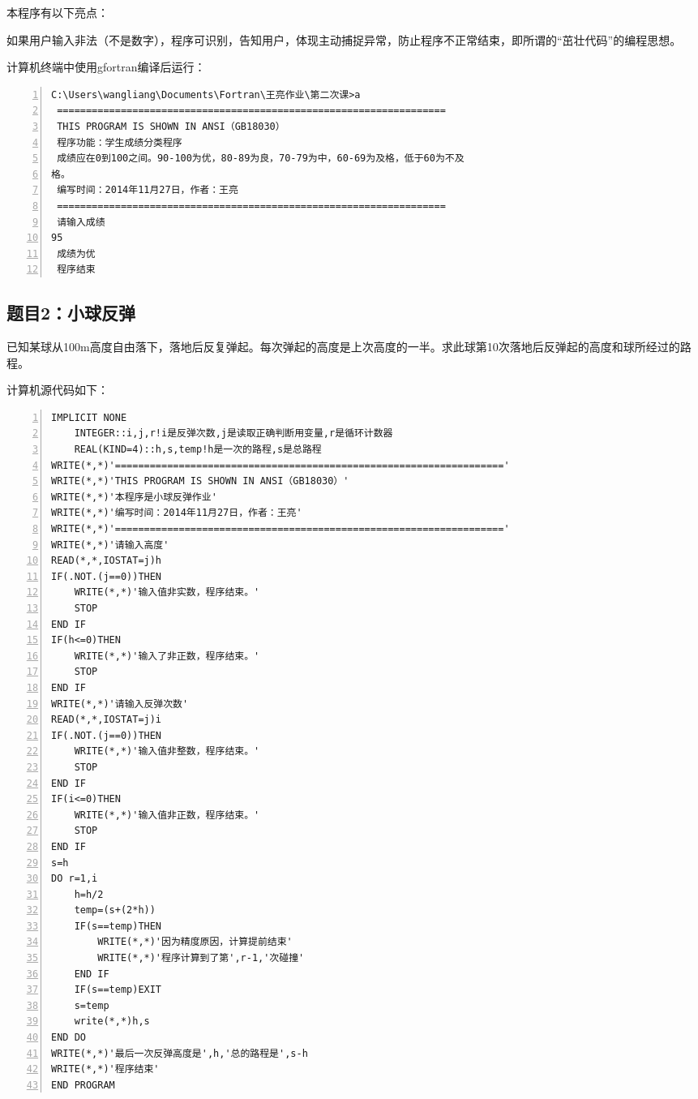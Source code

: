 \documentclass[hyperref,UTF-8]{ctexart}
\begin{document}
本程序有以下亮点：
\begin{dinglist}{47}
\item 如果用户输入非法（不是数字），程序可识别，告知用户，体现主动捕捉异常，防止程序不正常结束，即所谓的“茁壮代码”的编程思想。
\end{dinglist}

计算机终端中使用gfortran编译后运行：

\begin{Verbatim}[numbers=left,fontsize=\small]
C:\Users\wangliang\Documents\Fortran\王亮作业\第二次课>a
 ===================================================================
 THIS PROGRAM IS SHOWN IN ANSI（GB18030）
 程序功能：学生成绩分类程序
 成绩应在0到100之间。90-100为优，80-89为良，70-79为中，60-69为及格，低于60为不及
格。
 编写时间：2014年11月27日，作者：王亮
 ===================================================================
 请输入成绩
95
 成绩为优
 程序结束
\end{Verbatim}
\subsection{题目2：小球反弹}
已知某球从100m高度自由落下，落地后反复弹起。每次弹起的高度是上次高度的一半。求此球第10次落地后反弹起的高度和球所经过的路程。

计算机源代码如下：

\begin{Verbatim}[numbers=left,commandchars=\\\{\},fontsize=\small]
IMPLICIT NONE
	INTEGER::i,j,r!i是反弹次数,j是读取正确判断用变量,r是循环计数器
	REAL(KIND=4)::h,s,temp!h是一次的路程,s是总路程
WRITE(*,*)'==================================================================='
WRITE(*,*)'THIS PROGRAM IS SHOWN IN ANSI（GB18030）'
WRITE(*,*)'本程序是小球反弹作业'
WRITE(*,*)'编写时间：2014年11月27日，作者：王亮'
WRITE(*,*)'==================================================================='
WRITE(*,*)'请输入高度'
READ(*,*,IOSTAT=j)h
IF(.NOT.(j==0))THEN
	WRITE(*,*)'输入值非实数，程序结束。'
	STOP
END IF
IF(h<=0)THEN
	WRITE(*,*)'输入了非正数，程序结束。'
	STOP
END IF
WRITE(*,*)'请输入反弹次数'
READ(*,*,IOSTAT=j)i
IF(.NOT.(j==0))THEN
	WRITE(*,*)'输入值非整数，程序结束。'
	STOP
END IF
IF(i<=0)THEN
	WRITE(*,*)'输入值非正数，程序结束。'
	STOP
END IF
s=h
DO r=1,i
	h=h/2
	temp=(s+(2*h))
	IF(s==temp)THEN
		WRITE(*,*)'因为精度原因，计算提前结束'
		WRITE(*,*)'程序计算到了第',r-1,'次碰撞'
	END IF
	IF(s==temp)EXIT
	s=temp
	write(*,*)h,s
END DO
WRITE(*,*)'最后一次反弹高度是',h,'总的路程是',s-h
WRITE(*,*)'程序结束'
END PROGRAM
\end{Verbatim}
\end{document}
